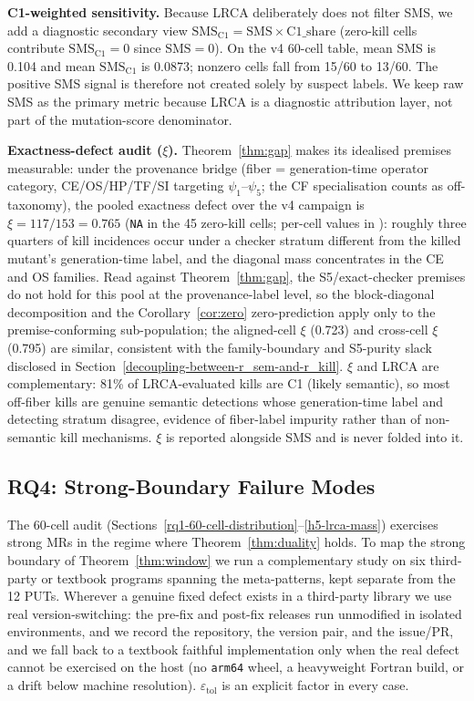 \documentclass[manuscript,screen,review]{acmart}
\begin{document}
\textbf{C1-weighted sensitivity.} Because LRCA deliberately does not
filter SMS, we add a diagnostic secondary view
$\mathrm{SMS}_{\mathrm{C1}} = \mathrm{SMS} \times \mathrm{C1\_share}$
(zero-kill cells contribute $\mathrm{SMS}_{\mathrm{C1}} = 0$ since
$\mathrm{SMS} = 0$).
On the v4 60-cell table, mean SMS is 0.104 and mean
$\mathrm{SMS}_{\mathrm{C1}}$ is 0.0873; nonzero cells fall from 15/60 to
13/60. The positive SMS signal is therefore not created solely
by suspect labels. We keep raw SMS as the primary metric because LRCA is
a diagnostic attribution layer, not part of the mutation-score
denominator.

\textbf{Exactness-defect audit ($\xi$).} Theorem~\ref{thm:gap} makes
its idealised premises measurable: under the provenance bridge (fiber =
generation-time operator category, CE/OS/HP/TF/SI targeting
$\psi_1$--$\psi_5$; the CF specialisation counts as off-taxonomy), the
pooled exactness defect over the v4 campaign is
$\xi = 117/153 = 0.765$ (\texttt{NA} in the 45 zero-kill cells;
per-cell values in ):
roughly three quarters of kill incidences occur under a checker stratum
different from the killed mutant's generation-time label, and the
diagonal mass concentrates in the CE and OS families. Read against
Theorem~\ref{thm:gap}, the S5/exact-checker premises do not hold for
this pool at the provenance-label level, so the block-diagonal
decomposition and the Corollary~\ref{cor:zero} zero-prediction apply
only to the premise-conforming sub-population; the aligned-cell $\xi$
(0.723) and cross-cell $\xi$ (0.795) are similar, consistent with the
family-boundary and S5-purity slack disclosed in
Section~\ref{decoupling-between-r_sem-and-r_kill}. $\xi$ and LRCA are
complementary: 81\% of LRCA-evaluated kills are C1 (likely semantic),
so most off-fiber kills are genuine semantic detections whose
generation-time label and detecting stratum disagree, evidence of
fiber-label impurity rather than of non-semantic kill mechanisms. $\xi$
is reported alongside SMS and is never folded into it.

\subsection{RQ4: Strong-Boundary Failure Modes}\label{rq4-strong-boundary}

The 60-cell audit (Sections~\ref{rq1-60-cell-distribution}--\ref{h5-lrca-mass}) exercises strong MRs in the regime where
Theorem~\ref{thm:duality} holds. To map the strong boundary of Theorem~\ref{thm:window} we run a
complementary study on six third-party or textbook programs spanning the
meta-patterns, kept separate from the 12 PUTs. Wherever a genuine fixed
defect exists in a third-party library we use real version-switching:
the pre-fix and post-fix releases run unmodified in isolated environments,
and we record the repository, the version pair, and the issue/PR, and
we fall back to a textbook faithful implementation only when the real
defect cannot be exercised on the host (no \texttt{arm64} wheel, a
heavyweight Fortran build, or a drift below machine resolution).
$\varepsilon_{\mathrm{tol}}$ is an explicit factor in every case.
\end{document}
